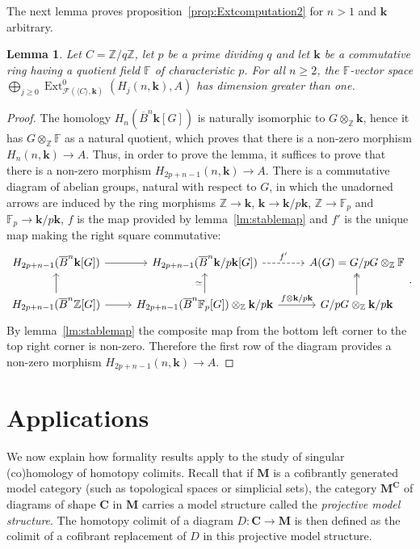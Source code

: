 \documentclass{amsart}
\newtheorem{lemma}[formula]{Lemma}
\theoremstyle{definition}
\theoremstyle{remark}
\newcommand{\Z}{\mathbb Z}
\newcommand{\F}{\mathbb F}
\DeclareMathOperator{\Ext}{Ext}
\renewcommand{\ge}{\geqslant}
\newcommand{\Cc}{\mathbf{C}}
\newcommand{\Mm}{\mathbf{M}}
\def\k{\mathbf{k}}
\begin{document}
The next lemma proves proposition~\ref{prop:Extcomputation2} for $n>1$ and $\k$ arbitrary.
\begin{lemma}
	Let $C=\Z/q\Z$, let $p$ be a prime dividing $q$ and let $\k$ be a commutative ring having a quotient field $\F$ of characteristic $p$. For all $n\ge 2$,
	the $\F$-vector space $\bigoplus_{j\ge 0}\Ext^0_{\mathcal{F}(\langle C\rangle,\k)}(H_j(n,\k),A)$ has dimension greater than one.
\end{lemma}
\begin{proof}
	The homology $H_n(\overline{B}^n\k[G])$ is naturally isomorphic to $G\otimes_\Z\k$, hence it has $G\otimes_\Z\F$ as a natural quotient, which proves that there is a non-zero morphism $H_n(n,\k)\to A$. Thus, in order to prove the lemma, it suffices to prove that there is a non-zero morphism $H_{2p+n-1}(n,\k)\to A$. 
	There is a commutative diagram of abelian groups, natural with respect to $G$, in which the unadorned arrows are induced by the ring morphisms $\Z\to \k$, $\k\to \k/p\k$, $\Z\to \F_p$ and $\F_p\to \k/p\k$, $f$ is the map provided by lemma~\ref{lm:stablemap} and $f'$ is the unique map making the right square commutative:
	\[
	\begin{tikzcd}
		H_{2p+n-1}(\overline{B}^n\k[G])\ar{r}{}&H_{2p+n-1}(\overline{B}^n\k/p\k[G])\ar[dashed]{r}{f'}&A(G)=G/pG\otimes_\Z\F\\
		H_{2p+n-1}(\overline{B}^n\Z[G])\ar{r}{}\ar{u}{}&H_{2p+n-1}(\overline{B}^n\F_p[G])\otimes_\Z\k/p\k\ar{u}{\simeq}\ar{r}{f\otimes\k/p\k}&G/pG\otimes_\Z\k/p\k\ar[two heads]{u}
	\end{tikzcd}.
	\]
	By lemma~\ref{lm:stablemap} the composite map from the bottom left corner to the top right corner is non-zero. Therefore the first row of the diagram provides a non-zero morphism $H_{2p+n-1}(n,\k)\to A$.
\end{proof}
	
\section{Applications}\label{sec:app}

We now explain how formality results apply to the study of singular (co)homology of homotopy colimits. 
Recall that if $\Mm$ is a cofibrantly generated model category (such as topological spaces or simplicial sets), the category $\Mm^\Cc$ of diagrams of shape $\Cc$ in $\Mm$ carries a model structure called the \emph{projective model structure}. The homotopy colimit of a diagram $D\colon\Cc\to \Mm$ is then defined as the colimit of a cofibrant replacement of $D$ in this projective model structure. 
\end{document}
